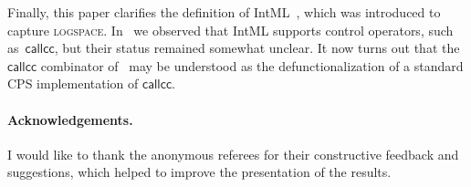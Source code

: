\documentclass{LMCS}
\theoremstyle{definition}
\theoremstyle{plain}
\newcommand{\kw}[1]{\mathsf{#1}}
\begin{document}
Finally, this paper clarifies the definition of IntML~\cite{intml}, which
was introduced to capture \textsc{logspace}. In~\cite{intml} we 
observed that IntML supports control operators, such as~$\kw{callcc}$,
but their status remained somewhat unclear. It now turns out that
the $\kw{callcc}$ combinator of~\cite{intml} 
may be understood as the defunctionalization of a standard
CPS implementation of $\kw{callcc}$. 

\paragraph{Acknowledgements.} 
I would like to thank the anonymous referees for their constructive
feedback and suggestions, which helped to improve the presentation of the results.



\end{document}
